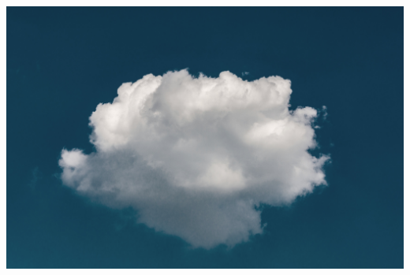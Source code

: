 \thispagestyle{empty}




    \thispagestyle{empty}

    \pagecolor{frontpage}\afterpage{\nopagecolor}

    \begin{minipage}[t][0.8\paperheight]{0.8\paperwidth}
        \begin{center}

                  {\color{white} \fontsize{52}{104}\selectfont \textbf{\theTitle} }

                  \vspace{0.2\paperheight}


                  \includegraphics[width=0.75\paperwidth]{fig/cloud}

                  \vspace{0.2\paperheight}

                 {\color{white} \fontsize{24}{48}\selectfont \textbf{\theAuthor} }
        \end{center}
    \end{minipage}

